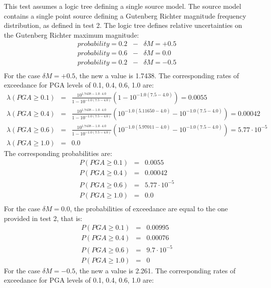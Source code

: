 This test assumes a logic tree defining a single source model. The
source model contains a single point source defining a Gutenberg Richter
magnitude frequency distribution, as defined in test 2. The logic tree defines
relative uncertainties on the Gutenberg Richter maximum magnitude:
\begin{eqnarray}
probability = 0.2 & - & \delta M = +0.5 \nonumber \\
probability = 0.6 & - & \delta M = 0.0 \nonumber \\
probability = 0.2 & - & \delta M = -0.5 \nonumber \\
\end{eqnarray}
For the case $\delta M = +0.5$, the new a value is 1.7438. The corresponding rates of exceedance for PGA levels of 0.1, 0.4, 0.6, 1.0 are:
\begin{eqnarray}
\lambda(PGA \geq 0.1) &=& \frac{10^{1.7438 - 1.0\cdot4.0}}{1 - 10^{-1.0(7.5 - 4.0)}}(1 - 10^{-1.0(7.5 - 4.0)}) = 0.0055\nonumber \\
\lambda(PGA \geq 0.4) &=& \frac{10^{1.7438 - 1.0\cdot4.0}}{1 - 10^{-1.0(7.5 - 4.0)}}(10^{-1.0(5.11650-4.0)} - 10^{-1.0(7.5 - 4.0)}) = 0.00042\nonumber \\
\lambda(PGA \geq 0.6) &=& \frac{10^{1.7438 - 1.0\cdot4.0}}{1 - 10^{-1.0(7.5 - 4.0)}}(10^{-1.0(5.97011-4.0)} - 10^{-1.0(7.5 - 4.0)}) =  5.77\cdot 10^{-5}\nonumber \\
\lambda(PGA \geq 1.0) &=& 0.0
\end{eqnarray}
The corresponding probabilities are:
\begin{eqnarray}
P(PGA \geq 0.1) &=& 0.0055\nonumber \\
P(PGA \geq 0.4) &=& 0.00042\nonumber \\
P(PGA \geq 0.6) &=& 5.77\cdot 10^{-5}\nonumber \\
P(PGA \geq 1.0) &=& 0.0\nonumber \\
\end{eqnarray}
For the case $\delta M = 0.0$, the probabilities of exceedance are equal to the one provided in test 2, that is:
\begin{eqnarray}
P(PGA \geq 0.1) &=& 0.00995 \nonumber \\
P(PGA \geq 0.4) &=& 0.00076 \nonumber \\
P(PGA \geq 0.6) &=& 9.7 \cdot 10^{-5} \nonumber \\
P(PGA \geq 1.0) &=&  0
\end{eqnarray}
For the case $\delta M = -0.5$, the new a value is 2.261. The corresponding rates of exceedance for PGA levels of 0.1, 0.4, 0.6, 1.0 are:
